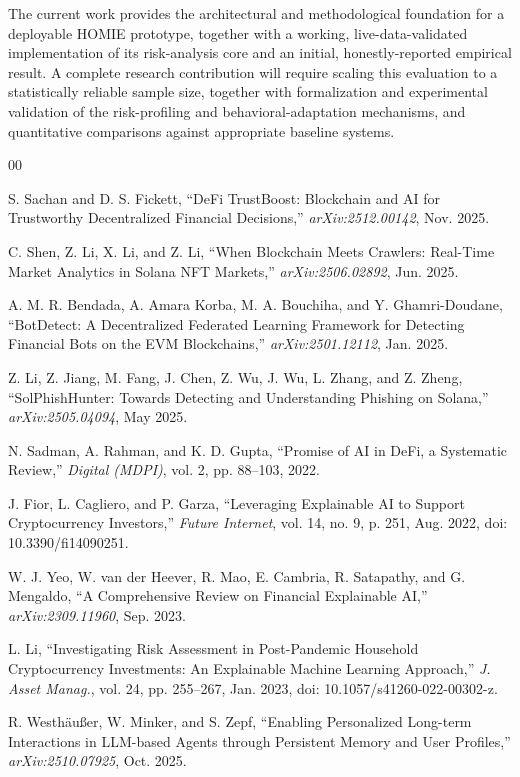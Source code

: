 \documentclass[conference]{IEEEtran}
\begin{document}
The current work provides the architectural and methodological foundation for a deployable HOMIE prototype, together with a working, live-data-validated implementation of its risk-analysis core and an initial, honestly-reported empirical result. A complete research contribution will require scaling this evaluation to a statistically reliable sample size, together with formalization and experimental validation of the risk-profiling and behavioral-adaptation mechanisms, and quantitative comparisons against appropriate baseline systems.

\begin{thebibliography}{00}

S. Sachan and D. S. Fickett, ``DeFi TrustBoost: Blockchain and AI for Trustworthy Decentralized Financial Decisions,'' \emph{arXiv:2512.00142}, Nov. 2025.

C. Shen, Z. Li, X. Li, and Z. Li, ``When Blockchain Meets Crawlers: Real-Time Market Analytics in Solana NFT Markets,'' \emph{arXiv:2506.02892}, Jun. 2025.

A. M. R. Bendada, A. Amara Korba, M. A. Bouchiha, and Y. Ghamri-Doudane, ``BotDetect: A Decentralized Federated Learning Framework for Detecting Financial Bots on the EVM Blockchains,'' \emph{arXiv:2501.12112}, Jan. 2025.

Z. Li, Z. Jiang, M. Fang, J. Chen, Z. Wu, J. Wu, L. Zhang, and Z. Zheng, ``SolPhishHunter: Towards Detecting and Understanding Phishing on Solana,'' \emph{arXiv:2505.04094}, May 2025.

N. Sadman, A. Rahman, and K. D. Gupta, ``Promise of AI in DeFi, a Systematic Review,'' \emph{Digital (MDPI)}, vol. 2, pp. 88--103, 2022.

J. Fior, L. Cagliero, and P. Garza, ``Leveraging Explainable AI to Support Cryptocurrency Investors,'' \emph{Future Internet}, vol. 14, no. 9, p. 251, Aug. 2022, doi: 10.3390/fi14090251.

W. J. Yeo, W. van der Heever, R. Mao, E. Cambria, R. Satapathy, and G. Mengaldo, ``A Comprehensive Review on Financial Explainable AI,'' \emph{arXiv:2309.11960}, Sep. 2023.

L. Li, ``Investigating Risk Assessment in Post-Pandemic Household Cryptocurrency Investments: An Explainable Machine Learning Approach,'' \emph{J. Asset Manag.}, vol. 24, pp. 255--267, Jan. 2023, doi: 10.1057/s41260-022-00302-z.

R. Westh\"au{\ss}er, W. Minker, and S. Zepf, ``Enabling Personalized Long-term Interactions in LLM-based Agents through Persistent Memory and User Profiles,'' \emph{arXiv:2510.07925}, Oct. 2025.


\end{thebibliography}
\end{document}
